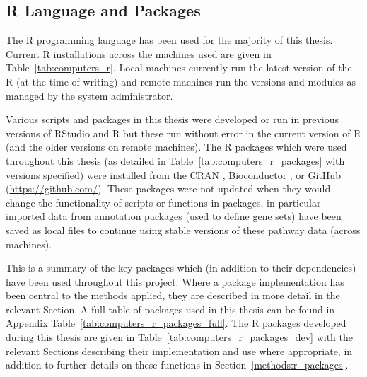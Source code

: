 \FloatBarrier

\subsection{R Language and Packages}


The R programming language has been used for the majority of this thesis. Current R installations across the machines used are given in Table~\ref{tab:computers_r}. Local machines currently run the latest version of the R (at the time of writing) and remote machines run the versions and modules as managed by the system administrator.

Various scripts and packages in this thesis were developed or run in previous versions of RStudio and R but these run without error in the current version of R (and the older versions on remote machines). The R packages which were used throughout this thesis (as detailed in Table~\ref{tab:computers_r_packages} with versions specified) were installed from the \acrfull{CRAN} \citep{CRAN}, Bioconductor \citep[][version 3.4; BiocInstaller 1.24.0]{Gentleman2004}, or GitHub (\url{https://github.com/}). These packages were not updated when they would change the functionality of scripts or functions in packages, in particular imported data from annotation packages (used to define gene sets) have been saved as local files to continue using stable versions of these \gls{pathway} data (across machines).

This is a summary of the key packages which (in addition to their dependencies) have been used throughout this project. Where a package implementation has been central to the methods applied, they are described in more detail in the relevant Section. A full table of packages used in this thesis can be found in Appendix Table~\ref{tab:computers_r_packages_full}. The R packages developed during this thesis are given in Table~\ref{tab:computers_r_packages_dev} with the relevant Sections describing their implementation and use where appropriate, in addition to further details on these functions in Section~\ref{methods:r_packages}. 


